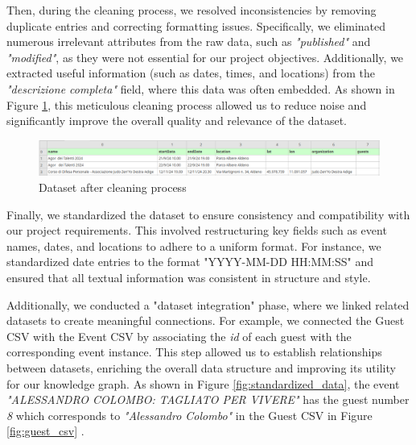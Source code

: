 \noindent Then, during the cleaning process, we resolved inconsistencies by removing duplicate entries and correcting formatting issues. Specifically, we eliminated numerous irrelevant attributes from the raw data, such as \textit{"published"} and \textit{"modified"}, as they were not essential for our project objectives. Additionally, we extracted useful information (such as dates, times, and locations) from the \textit{"descrizione completa"} field, where this data was often embedded. As shown in Figure \ref{fig:cleaned_data}, this meticulous cleaning process allowed us to reduce noise and significantly improve the overall quality and relevance of the dataset.
\begin{figure}[H]
    \centering
    \includegraphics[width=1\linewidth]{knowdive-files/cleaned_dataset.png}
    \caption{Dataset after cleaning process}
    \label{fig:cleaned_data}
\end{figure}

\noindent Finally, we standardized the dataset to ensure consistency and compatibility with our project requirements. This involved restructuring key fields such as event names, dates, and locations to adhere to a uniform format. For instance, we standardized date entries to the format "YYYY-MM-DD HH:MM:SS" and ensured that all textual information was consistent in structure and style. 
\vspace{0.4cm}

\noindent Additionally, we conducted a "dataset integration" phase, where we linked related datasets to create meaningful connections. For example, we connected the Guest CSV with the Event CSV by associating the \textit{id} of each guest with the corresponding event instance. This step allowed us to establish relationships between datasets, enriching the overall data structure and improving its utility for our knowledge graph. As shown in Figure \ref{fig:standardized_data}, the event \textit{"ALESSANDRO COLOMBO: TAGLIATO PER VIVERE"} has the guest number \textit{8} which corresponds to \textit{"Alessandro Colombo"} in the Guest CSV in Figure \ref{fig:guest_csv} .

